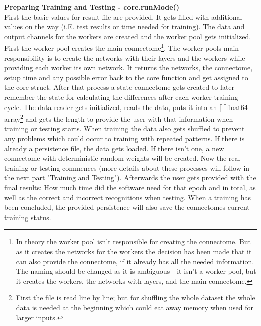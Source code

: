 \documentclass[11pt]{article}
\begin{document}
\textbf{Preparing Training and Testing - core.runMode()}\\
First the basic values for result file are provided. It gets filled with additional values on the way (i.E. test results or time needed for training). The data and output channels for the workers are created and the worker pool gets initialized.
First the worker pool creates the main connectome\footnote{In theory the worker pool isn't responsible for creating the connectome. But as it creates the networks for the workers the decision has been made that it can also provide the connectome, if it already has all the needed information. The naming should be changed as it is ambiguous - it isn't a worker pool, but it creates the workers, the networks with layers, and the main connectome.}. The worker pools main responsibility is to create the networks with their layers and the workers while providing each worker its own network. It returns the networks, the connectome, setup time and any possible error back to the core function and get assigned to the core struct. After that process a state connectome gets created to later remember the state for calculating the differences after each worker training cycle.
The data reader gets initialized, reads the data, puts it into an [][]float64 array\footnote{First the file is read line by line; but for shuffling the whole dataset the whole data is needed at the beginning which could eat away memory when used for larger inputs.} and gets the length to provide the user with that information when training or testing starts. When training the data also gets shuffled to prevent any problems which could occur to training with repeated patterns.
If there is already a persistence file, the data gets loaded. If there isn't one, a new connectome with deterministic random weights will be created. Now the real training or testing commences (more details about these processes will follow in the next part "Training and Testing").
Afterwards the user gets provided with the final results: How much time did the software need for that epoch and in total, as well as the correct and incorrect recognitions when testing. When a training has been concluded, the provided persistence will also save the connectomes current training status.
\end{document}
